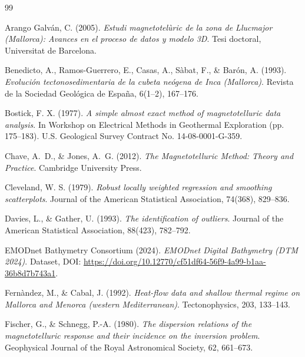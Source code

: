 \documentclass[11pt,a4paper,oneside]{article}
\begin{document}
\begin{thebibliography}{99}

 Arango Galv\'an, C. (2005).
  \textit{Estudi magnetotel\`uric de la zona de Llucmajor (Mallorca): Avances en el proceso de datos y modelo 3D}.
  Tesi doctoral, Universitat de Barcelona.

 Benedicto, A., Ramos-Guerrero, E., Casas, A., Sàbat, F., \& Barón, A. (1993).
  \textit{Evolución tectonosedimentaria de la cubeta neógena de Inca (Mallorca)}.
  Revista de la Sociedad Geológica de España, 6(1--2), 167--176.

 Bostick, F. X. (1977).
  \textit{A simple almost exact method of magnetotelluric data analysis}.
  In Workshop on Electrical Methods in Geothermal Exploration (pp. 175--183). U.S. Geological Survey Contract No. 14-08-0001-G-359.

 Chave, A.~D., \& Jones, A.~G. (2012).
  \textit{The Magnetotelluric Method: Theory and Practice}.
  Cambridge University Press.

 Cleveland, W. S. (1979).
  \textit{Robust locally weighted regression and smoothing scatterplots}.
  Journal of the American Statistical Association, 74(368), 829--836.

 Davies, L., \& Gather, U. (1993).
  \textit{The identification of outliers}.
  Journal of the American Statistical Association, 88(423), 782--792.

 EMODnet Bathymetry Consortium (2024).
  \textit{EMODnet Digital Bathymetry (DTM 2024)}.
  Dataset, DOI: \url{https://doi.org/10.12770/cf51df64-56f9-4a99-b1aa-36b8d7b743a1}.


 Fern\`andez, M., \& Cabal, J. (1992).
  \textit{Heat-flow data and shallow thermal regime on Mallorca and Menorca (western Mediterranean)}.
  Tectonophysics, 203, 133--143.

 Fischer, G., \& Schnegg, P.-A. (1980).
  \textit{The dispersion relations of the magnetotelluric response and their incidence on the inversion problem}.
  Geophysical Journal of the Royal Astronomical Society, 62, 661--673.


\end{thebibliography}
\end{document}
